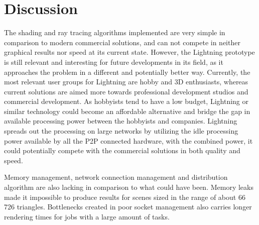 \section{Discussion}



The shading and ray tracing algorithms implemented are very simple in
comparison to modern commercial solutions, and can not compete 
in neither graphical results nor speed at its current state. However, the
Lightning prototype is still relevant and interesting for 
future developments in its field, as it approaches the problem in a different
and potentially better way. Currently, the most 
relevant user groups for Lightning are hobby and 3D enthusiasts, whereas
current solutions are aimed more towards professional 
development studios and commercial development. As hobbyists tend to have a
low budget, Lightning or similar technology could become 
an affordable alternative and bridge the gap in available processing power
between the hobbyists and companies. Lightning spreads 
out the processing on large networks by utilizing the idle processing power
available by all the P2P connected hardware, with the 
combined power, it could potentially compete with the commercial solutions
in both quality and speed.

Memory management, network connection management and distribution algorithm are
also lacking in comparison to what could have been. Memory leaks made it
impossible to produce results for scenes sized in the range of about 66 726
triangles. Bottlenecks created in poor socket management also carries longer
rendering times for jobs with a large amount of tasks.


